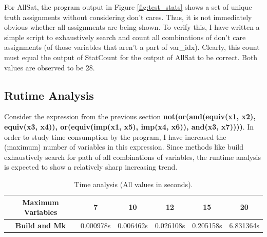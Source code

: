 \documentclass[a4paper, titlepage, 12pt]{article}
\numberwithin{equation}{section}
\begin{document}
\begin{itemize}
                    For AllSat, the program output in Figure \ref{fig:test_stats} shows a set of unique truth assignments without considering don't cares.
                    Thus, it is not immediately obvious whether all assignments are being shown.
                    To verify this, I have written a simple script to exhaustively search and count all combinations of don't care assignments (of those variables that aren't a part of var\_idx).
                    Clearly, this count must equal the output of StatCount for the output of AllSat to be correct.
                    Both values are observed to be 28.


            \end{itemize}

        \subsection{Rutime Analysis}
            
            Consider the expression from the previous section \textbf{not(or(and(equiv(x1, x2), equiv(x3, x4)), or(equiv(imp(x1, x5), imp(x4, x6)), and(x3, x7))))}.
            In order to study time consumption by the program, I have increased the (maximum) number of variables in this expression.
            Since methods like build exhaustively search for path of all combinations of variables, the runtime analysis is expected to show a relatively sharp increasing trend.

            \begin{table}[H]
                \centering
                \caption{Time analysis (All values in seconds).}
                \label{tab:time_analysis}
                \begin{tabular}{|c|c|c|c|c|c|}
                    \hline \textbf{Maximum Variables} & \textbf{7} & \textbf{10} & \textbf{12} & \textbf{15} & \textbf{20} \\ \hline
                    \textbf{Build and Mk} & 0.000978s & 0.006462s & 0.026108s & 0.205158s & 6.831364s\\ \hline
                \end{tabular}
            \end{table}
\end{document}
